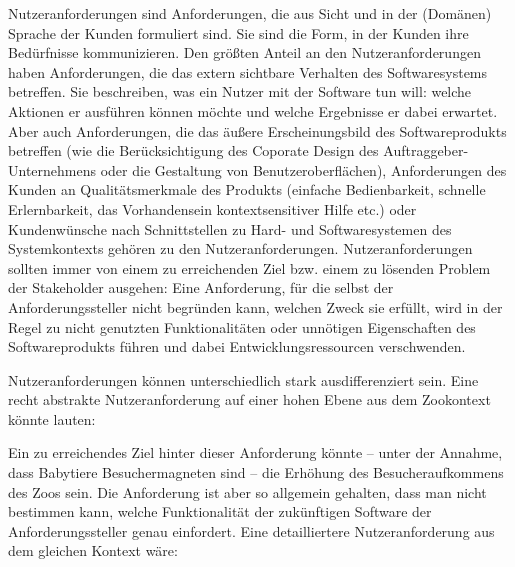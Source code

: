 Nutzeranforderungen sind Anforderungen, die aus Sicht und in der (Domänen)
\linebreak %
Sprache der Kunden formuliert sind. Sie sind die Form, in der Kunden ihre Bedürfnisse kommunizieren. Den größten Anteil an den Nutzeranforderungen haben Anforderungen, die das extern sichtbare Verhalten des Softwaresystems betreffen. Sie beschreiben, was ein Nutzer mit der Software tun will: welche Aktionen er ausführen können möchte und welche Ergebnisse er dabei erwartet. Aber auch Anforderungen, die das äußere Erscheinungsbild des Softwareprodukts betreffen (wie die Berücksichtigung des Coporate Design des Auftraggeber-Unternehmens oder die Gestaltung von Benutzeroberflächen), Anforderungen des Kunden an Qualitätsmerkmale des Produkts (\zb einfache Bedienbarkeit, schnelle Erlernbarkeit, das Vorhandensein kontextsensitiver Hilfe etc.) oder Kundenwünsche nach Schnittstellen zu Hard- und Softwaresystemen des Systemkontexts gehören zu den Nutzeranforderungen. Nutzeranforderungen sollten immer von einem zu erreichenden Ziel bzw. einem zu lösenden Problem der Stakeholder ausgehen: Eine Anforderung, für die selbst der Anforderungssteller nicht begründen kann, welchen Zweck sie erfüllt, wird in der Regel zu nicht genutzten Funktionalitäten oder unnötigen Eigenschaften des Softwareprodukts führen und dabei Entwicklungsressourcen verschwenden.

\vspace{2mm} %


\vspace{2mm} %


Nutzeranforderungen können unterschiedlich stark ausdifferenziert sein. Eine recht abstrakte Nutzeranforderung auf einer hohen Ebene aus dem Zookontext könnte lauten:

\vspace{2mm} %


\vspace{\baselineskip} %

Ein zu erreichendes Ziel hinter dieser Anforderung könnte -- unter der Annahme, dass Babytiere Besuchermagneten sind -- die Erhöhung des Besucheraufkommens des Zoos sein. Die Anforderung ist aber so allgemein gehalten, dass man nicht bestimmen kann, welche Funktionalität der zukünftigen Software der Anforderungssteller genau einfordert. Eine detailliertere Nutzeranforderung aus dem gleichen 
\linebreak %
Kontext wäre:

